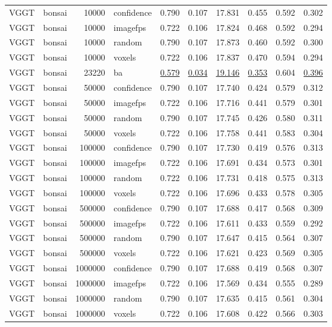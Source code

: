 \begin{table}[H]
\begin{tabular}{llrlrrrrrr}
VGGT & bonsai & 10000 & confidence & 0.790 & 0.107 & 17.831 & 0.455 & 0.592 & 0.302 \\
VGGT & bonsai & 10000 & imagefps & 0.722 & 0.106 & 17.824 & 0.468 & 0.592 & 0.294 \\
VGGT & bonsai & 10000 & random & 0.790 & 0.107 & 17.873 & 0.460 & 0.592 & 0.300 \\
VGGT & bonsai & 10000 & voxels & 0.722 & 0.106 & 17.837 & 0.470 & 0.594 & 0.294 \\
VGGT & bonsai & 23220 & ba & \underline{0.579} & \underline{0.034} & \underline{19.146} & \underline{0.353} & 0.604 & \underline{0.396} \\
VGGT & bonsai & 50000 & confidence & 0.790 & 0.107 & 17.740 & 0.424 & 0.579 & 0.312 \\
VGGT & bonsai & 50000 & imagefps & 0.722 & 0.106 & 17.716 & 0.441 & 0.579 & 0.301 \\
VGGT & bonsai & 50000 & random & 0.790 & 0.107 & 17.745 & 0.426 & 0.580 & 0.311 \\
VGGT & bonsai & 50000 & voxels & 0.722 & 0.106 & 17.758 & 0.441 & 0.583 & 0.304 \\
VGGT & bonsai & 100000 & confidence & 0.790 & 0.107 & 17.730 & 0.419 & 0.576 & 0.313 \\
VGGT & bonsai & 100000 & imagefps & 0.722 & 0.106 & 17.691 & 0.434 & 0.573 & 0.301 \\
VGGT & bonsai & 100000 & random & 0.722 & 0.106 & 17.731 & 0.418 & 0.575 & 0.313 \\
VGGT & bonsai & 100000 & voxels & 0.722 & 0.106 & 17.696 & 0.433 & 0.578 & 0.305 \\
VGGT & bonsai & 500000 & confidence & 0.790 & 0.107 & 17.688 & 0.417 & 0.568 & 0.309 \\
VGGT & bonsai & 500000 & imagefps & 0.722 & 0.106 & 17.611 & 0.433 & 0.559 & 0.292 \\
VGGT & bonsai & 500000 & random & 0.790 & 0.107 & 17.647 & 0.415 & 0.564 & 0.307 \\
VGGT & bonsai & 500000 & voxels & 0.722 & 0.106 & 17.621 & 0.423 & 0.569 & 0.305 \\
VGGT & bonsai & 1000000 & confidence & 0.790 & 0.107 & 17.688 & 0.419 & 0.568 & 0.307 \\
VGGT & bonsai & 1000000 & imagefps & 0.722 & 0.106 & 17.569 & 0.434 & 0.555 & 0.289 \\
VGGT & bonsai & 1000000 & random & 0.790 & 0.107 & 17.635 & 0.415 & 0.561 & 0.304 \\
VGGT & bonsai & 1000000 & voxels & 0.722 & 0.106 & 17.608 & 0.422 & 0.566 & 0.303 \\

\end{tabular}
\end{table}
